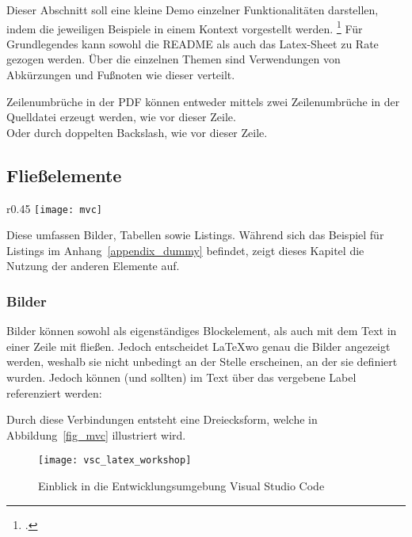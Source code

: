 Dieser Abschnitt soll eine kleine Demo einzelner Funktionalitäten darstellen, indem die jeweiligen Beispiele in einem Kontext vorgestellt werden.
\footcite[An dieser Stelle soll erneut auf die Lizenz hingewiesen werden. Siehe][]{ccOJlizenz}
Für Grundlegendes kann sowohl die README als auch das Latex-Sheet zu Rate gezogen werden. 
Über die einzelnen Themen sind Verwendungen von Abkürzungen und Fußnoten wie dieser verteilt. 

Zeilenumbrüche in der PDF können entweder mittels zwei Zeilenumbrüche in der Quelldatei erzeugt werden, wie vor dieser Zeile.\\
Oder durch doppelten Backslash, wie vor dieser Zeile.

\subsection{Fließelemente}
  \begin{wrapfigure}{r}{0.45\linewidth}
    \centering
    \texttt{[image: mvc]}
    \caption[Aufbau von \acrlong{MVC}]{Aufbau von \gls{MVC}.\\Quelle: Angelehnt an \cite{curry2008flexible}}
    \label{fig_mvc}
  \end{wrapfigure}

  Diese umfassen Bilder, Tabellen sowie Listings.
  Während sich das Beispiel für Listings im Anhang~\ref{appendix_dummy} befindet, zeigt dieses Kapitel die Nutzung der anderen Elemente auf.

 \subsubsection{Bilder}
    Bilder können sowohl als eigenständiges Blockelement, als auch mit dem Text in einer Zeile mit fließen.
    Jedoch entscheidet \LaTeX wo genau die Bilder angezeigt werden, weshalb sie nicht unbedingt an der Stelle erscheinen,
    an der sie definiert wurden.
    Jedoch können (und sollten) im Text über das vergebene Label referenziert werden:

    Durch diese Verbindungen entsteht eine Dreiecksform, welche in Abbildung~\ref{fig_mvc} illustriert wird.

    \begin{figure}[tbh]
      \centering
      \texttt{[image: vsc\_latex\_workshop]}
      \caption{Einblick in die Entwicklungsumgebung Visual Studio Code}
      \label{fig_prototyp_desktop}
    \end{figure}

